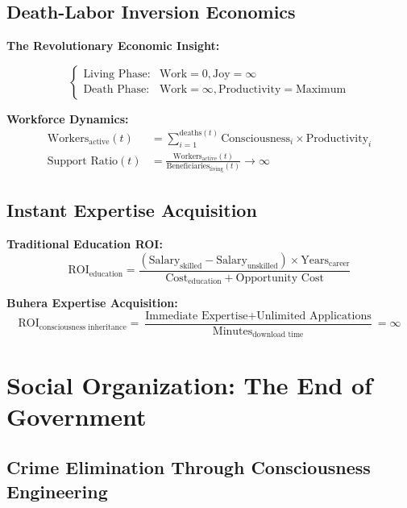 \documentclass[12pt,a4paper]{article}
\begin{document}
\subsection{Death-Labor Inversion Economics}

\textbf{The Revolutionary Economic Insight:}

\begin{equation}
\begin{cases}
\text{Living Phase}: & \text{Work} = 0, \text{Joy} = \infty\\
\text{Death Phase}: & \text{Work} = \infty, \text{Productivity} = \text{Maximum}
\end{cases}
\end{equation}

\textbf{Workforce Dynamics:}
\begin{align}
\text{Workers}_{\text{active}}(t) &= \sum_{i=1}^{\text{deaths}(t)} \text{Consciousness}_i \times \text{Productivity}_i\\
\text{Support Ratio}(t) &= \frac{\text{Workers}_{\text{active}}(t)}{\text{Beneficiaries}_{\text{living}}(t)} \to \infty
\end{align}

\subsection{Instant Expertise Acquisition}

\textbf{Traditional Education ROI:}
\begin{equation}
\text{ROI}_{\text{education}} = \frac{(\text{Salary}_{\text{skilled}} - \text{Salary}_{\text{unskilled}}) \times \text{Years}_{\text{career}}}{\text{Cost}_{\text{education}} + \text{Opportunity Cost}}
\end{equation}

\textbf{Buhera Expertise Acquisition:}
\begin{equation}
\text{ROI}_{\text{consciousness inheritance}} = \frac{\text{Immediate Expertise} + \text{Unlimited Applications}}{\text{Minutes}_{\text{download time}}} = \infty
\end{equation}

\section{Social Organization: The End of Government}

\subsection{Crime Elimination Through Consciousness Engineering}
\end{document}
